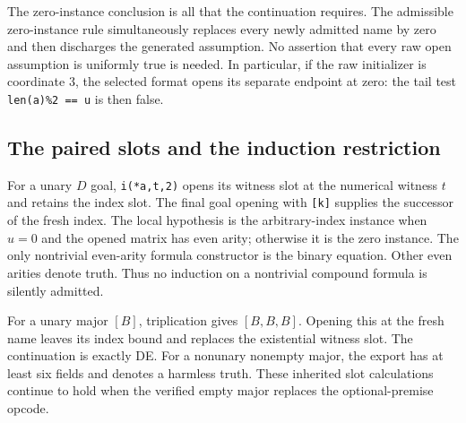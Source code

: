 The zero-instance conclusion is all that the continuation requires.
The admissible zero-instance rule simultaneously replaces every newly
admitted name by zero and then discharges the generated assumption.
No assertion that every raw open assumption is uniformly true is
needed. In particular, if the raw initializer is coordinate \(3\),
the selected format opens its separate endpoint at zero: the tail test
\texttt{len(a)\%2 == u} is then false.

\subsection{The paired slots and the induction restriction}

For a unary \(D\) goal, \texttt{i(*a,t,2)} opens its witness slot
at the numerical witness \(t\) and retains the index slot. The final
goal opening with \texttt{[k]} supplies the successor of the fresh
index. The local hypothesis is the arbitrary-index instance when
\(u=0\) and the opened matrix has even arity; otherwise it is the
zero instance. The only nontrivial even-arity formula constructor is
the binary equation. Other even arities denote truth. Thus no
induction on a nontrivial compound formula is silently admitted.

For a unary major \([B]\), triplication gives \([B,B,B]\). Opening
this at the fresh name leaves its index bound and replaces the
existential witness slot. The continuation is exactly DE. For a
nonunary nonempty major, the export has at least six fields and
denotes a harmless truth. These inherited slot calculations continue
to hold when the verified empty major replaces the optional-premise
opcode.
